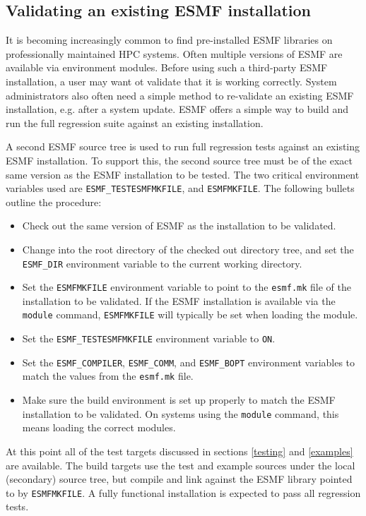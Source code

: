 
\subsection{Validating an existing ESMF installation}
\label{esmfmkfiletesting}

It is becoming increasingly common to find pre-installed ESMF libraries on 
professionally maintained HPC systems. Often multiple versions of ESMF are
available via environment modules. Before using such a third-party ESMF 
installation, a user may want ot validate that it is working correctly. System
administrators also often need a simple method to re-validate an existing
ESMF installation, e.g. after a system update. ESMF offers a simple way to
build and run the full regression suite against an existing installation.

A second ESMF source tree is used to run full regression tests against an
existing ESMF installation. To support this, the second source tree must be
of the exact same version as the ESMF installation to be tested. The two
critical environment variables used are {\tt ESMF\_TESTESMFMKFILE}, and 
{\tt ESMFMKFILE}. The following bullets outline the procedure:

\begin{itemize}

\item Check out the same version of ESMF as the installation to be validated.

\item Change into the root directory of the checked out directory tree, and
      set the {\tt ESMF\_DIR} environment variable to the current working
      directory.

\item Set the {\tt ESMFMKFILE} environment variable to point to the 
      {\tt esmf.mk} file of the installation to be validated. If the ESMF
      installation is available via the {\tt module} command, {\tt ESMFMKFILE} 
      will typically be set when loading the module.
      
\item Set the {\tt ESMF\_TESTESMFMKFILE} environment variable to {\tt ON}.

\item Set the {\tt ESMF\_COMPILER}, {\tt ESMF\_COMM}, and {\tt ESMF\_BOPT}
      environment variables to match the values from the {\tt esmf.mk} file.
      
\item Make sure the build environment is set up properly to match the 
      ESMF installation to be validated. On systems using the {\tt module}
      command, this means loading the correct modules.
      
\end{itemize}

At this point all of the test targets discussed in sections \ref{testing} and
\ref{examples} are available. The build targets use the test
and example sources under the local (secondary) source tree, but compile and
link against the ESMF library pointed to by {\tt ESMFMKFILE}. A fully 
functional installation is expected to pass all regression tests.
